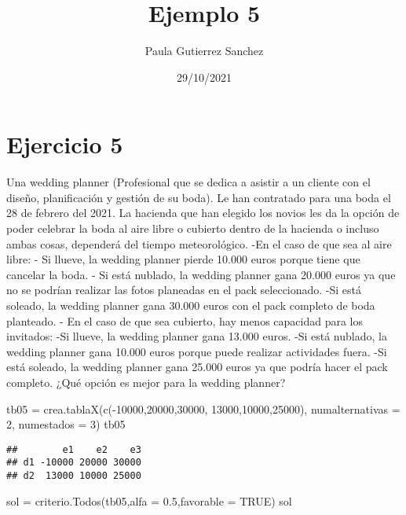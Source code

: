 \documentclass[
]{article}
\title{Ejemplo 5}
\author{Paula Gutierrez Sanchez}
\date{29/10/2021}
\newenvironment{Shaded}{\begin{snugshade}}{\end{snugshade}}
\newcommand{\AttributeTok}[1]{\textcolor[rgb]{0.77,0.63,0.00}{#1}}
\newcommand{\ConstantTok}[1]{\textcolor[rgb]{0.00,0.00,0.00}{#1}}
\newcommand{\DecValTok}[1]{\textcolor[rgb]{0.00,0.00,0.81}{#1}}
\newcommand{\FloatTok}[1]{\textcolor[rgb]{0.00,0.00,0.81}{#1}}
\newcommand{\FunctionTok}[1]{\textcolor[rgb]{0.00,0.00,0.00}{#1}}
\newcommand{\NormalTok}[1]{#1}
\newcommand{\OtherTok}[1]{\textcolor[rgb]{0.56,0.35,0.01}{#1}}
\newcommand{\SpecialCharTok}[1]{\textcolor[rgb]{0.00,0.00,0.00}{#1}}
\begin{document}
\maketitle

\hypertarget{ejercicio-5}{%
\section{Ejercicio 5}\label{ejercicio-5}}

Una wedding planner (Profesional que se dedica a asistir a un cliente
con el diseño, planificación y gestión de su boda). Le han contratado
para una boda el 28 de febrero del 2021. La hacienda que han elegido los
novios les da la opción de poder celebrar la boda al aire libre o
cubierto dentro de la hacienda o incluso ambas cosas, dependerá del
tiempo meteorológico. -En el caso de que sea al aire libre: - Si llueve,
la wedding planner pierde 10.000 euros porque tiene que cancelar la
boda. - Si está nublado, la wedding planner gana 20.000 euros ya que no
se podrían realizar las fotos planeadas en el pack seleccionado. -Si
está soleado, la wedding planner gana 30.000 euros con el pack completo
de boda planteado. - En el caso de que sea cubierto, hay menos capacidad
para los invitados: -Si llueve, la wedding planner gana 13.000 euros.
-Si está nublado, la wedding planner gana 10.000 euros porque puede
realizar actividades fuera. -Si está soleado, la wedding planner gana
25.000 euros ya que podría hacer el pack completo. ¿Qué opción es mejor
para la wedding planner?

\begin{Shaded}
\begin{Highlighting}[]
\NormalTok{tb05 }\OtherTok{=} \FunctionTok{crea.tablaX}\NormalTok{(}\FunctionTok{c}\NormalTok{(}\SpecialCharTok{{-}}\DecValTok{10000}\NormalTok{,}\DecValTok{20000}\NormalTok{,}\DecValTok{30000}\NormalTok{,}
                      \DecValTok{13000}\NormalTok{,}\DecValTok{10000}\NormalTok{,}\DecValTok{25000}\NormalTok{), }\AttributeTok{numalternativas =} \DecValTok{2}\NormalTok{, }\AttributeTok{numestados =} \DecValTok{3}\NormalTok{)}
\NormalTok{tb05}
\end{Highlighting}
\end{Shaded}

\begin{verbatim}
##        e1    e2    e3
## d1 -10000 20000 30000
## d2  13000 10000 25000
\end{verbatim}

\begin{Shaded}
\begin{Highlighting}[]
\NormalTok{sol }\OtherTok{=} \FunctionTok{criterio.Todos}\NormalTok{(tb05,}\AttributeTok{alfa =} \FloatTok{0.5}\NormalTok{,}\AttributeTok{favorable =} \ConstantTok{TRUE}\NormalTok{)}
\NormalTok{sol}
\end{Highlighting}
\end{Shaded}
\end{document}
